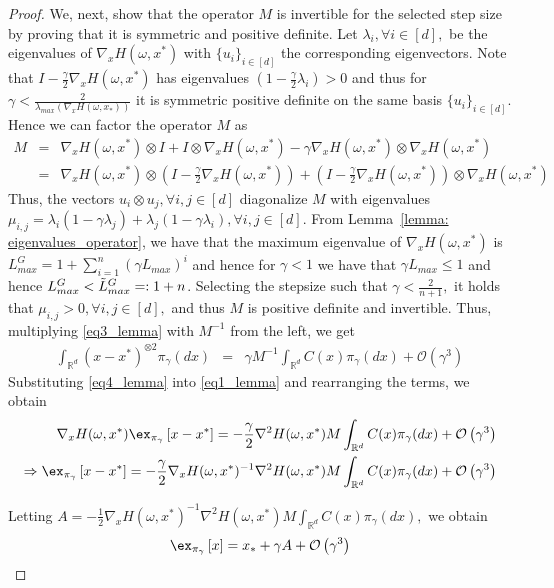\begin{proof}
    We, next, show that the operator $M$ is invertible for the selected step size by proving that it is symmetric and positive definite. Let $\lambda_i, \forall i \in [d],$ be the eigenvalues of $\nabla_{x} H(\omega,x^*)$ with $\{u_i\}_{i\in[d]}$ the corresponding eigenvectors. Note that $I - \frac{\gamma}{2} \nabla_{x} H(\omega,x^*)$ has eigenvalues $(1-\frac{\gamma}{2} \lambda_i) > 0$ and thus for $\gamma < \frac{2}{\lambda_{max}(\nabla_{x} H(\omega,x_*))}$ it is symmetric positive definite on the same basis $\{u_i\}_{i\in[d]}$. Hence we can factor the operator $M$ as 
    \begin{eqnarray}
        M &=& \nabla_{x} H(\omega,x^*)\otimes I + I \otimes \nabla_{x} H(\omega,x^*)-\gamma \nabla_{x} H(\omega,x^*)\otimes \nabla_{x} H(\omega,x^*) \nonumber \\
        &=& \nabla_{x} H(\omega,x^*)\otimes(I-\frac{\gamma}{2}\nabla_{x} H(\omega,x^*)) + (I - \frac{\gamma}{2} \nabla_{x} H(\omega,x^*)) \otimes \nabla_{x} H(\omega,x^*) \nonumber
    \end{eqnarray}
    Thus, the vectors $u_i \otimes u_j, \forall i, j\in[d]$ diagonalize $M$ with eigenvalues $\mu_{i, j} =\lambda_i (1-\gamma \lambda_j)+\lambda_j(1 - \gamma\lambda_i), \forall i, j\in[d]$. From Lemma~\ref{lemma: eigenvalues_operator}, we have that the maximum eigenvalue of $\nabla_{x} H(\omega,x^*)$ is $L_{max}^G = 1 + \sum\limits_{i=1}^{n} (\gamma L_{max})^i$ and hence for $\gamma < 1$ we have that $\gamma L_{max} \leq 1$ and hence $L_{max}^G < \Tilde{L}_{max}^G =: 1 + n$. Selecting the stepsize such that $\gamma < \frac{2}{n+1},$ it holds that $\mu_{i, j} > 0, \forall i, j\in[d],$ and thus $M$ is positive definite and invertible. 
    Thus, multiplying \eqref{eq3_lemma} with $M^{-1}$ from the left, we get
    \begin{eqnarray}
        \int_{\mathbb{R}^d} (x - x^*)^{\otimes2} \pi_\gamma(dx) &=& \gamma M^{-1} \int_{\mathbb{R}^d} C(x) \pi_\gamma(dx) + \mathcal{O}\left(\gamma^3\right) \label{eq4_lemma}
    \end{eqnarray}
    Substituting \eqref{eq4_lemma} into \eqref{eq1_lemma} and rearranging the terms, we obtain
    \begin{eqnarray}
        \nabla_{x} H(\omega,x^*)\Expepgamma{x - x^*} = - \frac{\gamma}{2} \nabla^2 H(\omega,x^*)M \int_{\mathbb{R}^d} C(x) \pi_\gamma(dx) + \mathcal{O}\left(\gamma^3\right) \nonumber \\
        \Rightarrow \Expepgamma{x - x^*} = - \frac{\gamma}{2} \nabla_{x} H(\omega,x^*)^{-1}\nabla^2 H(\omega,x^*)M \int_{\mathbb{R}^d} C(x) \pi_\gamma(dx) + \mathcal{O}\left(\gamma^3\right)
    \end{eqnarray}
    
    Letting $A = - \frac{1}{2} \nabla_{x} H(\omega,x^*)^{-1}\nabla^2 H(\omega,x^*)M \int_{\mathbb{R}^d} C(x) \pi_\gamma(dx),$ we obtain 
    \begin{eqnarray}
        \Expepgamma{x} = x_* + \gamma A + \mathcal{O}\left(\gamma^3\right) 
    \end{eqnarray}
\end{proof}

